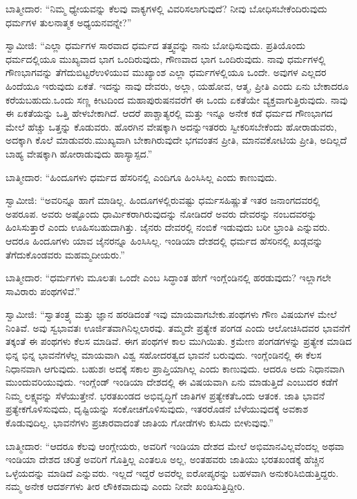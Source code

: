 ಬಾತ್ಮೀದಾರ: “ನಿಮ್ಮ ಧ್ಯೇಯವನ್ನು ಕೆಲವು ವಾಕ್ಯಗಳಲ್ಲಿ ವಿವರಿಸಲಾಗುವುದೆ? ನೀವು ಬೋಧಿಸಬೇಕೆಂದಿರುವುದು ಧರ್ಮಗಳ ತುಲನಾತ್ಮಕ ಅಧ್ಯಯನವನ್ನೇ?”

ಸ್ವಾಮೀಜಿ: “ಎಲ್ಲಾ ಧರ್ಮಗಳ ಸಾರವಾದ ಧರ್ಮದ ತತ್ತ್ವವನ್ನು ನಾನು ಬೋಧಿಸುವುದು. ಪ್ರತಿಯೊಂದು ಧರ್ಮದಲ್ಲಿಯೂ ಮುಖ್ಯವಾದ ಭಾಗ ಒಂದಿರುವುದು, ಗೌಣವಾದ ಭಾಗ ಒಂದಿರುವುದು. ನಾವು ಧರ್ಮಗಳಲ್ಲಿ ಗೌಣಭಾಗವನ್ನು ತೆಗೆದುಬಿಟ್ಟರೆ\break ಉಳಿಯುವ ಮುಖ್ಯಾಂಶ ಎಲ್ಲಾ ಧರ್ಮಗಳಲ್ಲಿಯೂ ಒಂದೇ. ಅವುಗಳ ಎಲ್ಲದರ ಹಿಂದೆಯೂ ಇರುವುದು ಏಕತೆ. ಇದನ್ನು ನಾವು ದೇವರು, ಅಲ್ಲಾ, ಯಹೋವ, ಆತ್ಮ, ಪ್ರೀತಿ ಎಂದು ಏನು ಬೇಕಾದರೂ ಕರೆಯಬಹುದು.ಒಂದು ಸಣ್ಣ ಕೀಟದಿಂದ ಮಹಾ\-ಪುರುಷನವರೆಗೆ ಈ ಒಂದು ಏಕತೆಯೇ ವ್ಯಕ್ತವಾಗುತ್ತಿರುವುದು. ನಾವು ಈ ಏಕತೆಯನ್ನು ಒತ್ತಿ ಹೇಳಬೇಕಾಗಿದೆ. ಆದರೆ ಪಾಶ್ಚಾತ್ಯರಲ್ಲಿ ಮತ್ತು ಇನ್ನೂ ಅನೇಕ ಕಡೆ ಧರ್ಮದ ಗೌಣಭಾಗದ ಮೇಲೆ ಹೆಚ್ಚು ಒತ್ತನ್ನು ಕೊಡುವರು. ಹೊರಗಿನ ವೇಷಕ್ಕಾಗಿ ಅದನ್ನು\break ಇತರರು ಸ್ವೀಕರಿಸಬೇಕೆಂದು ಹೋರಾಡುವರು, ಅದಕ್ಕಾಗಿ ಕೊಲೆ ಮಾಡುವರು.\break ಮುಖ್ಯವಾಗಿ ಬೇಕಾಗಿರುವುದೇ ಭಗವಂತನ ಪ್ರೀತಿ, ಮಾನವಕೋಟಿಯ ಪ್ರೀತಿ, ಅದಿಲ್ಲದೆ ಬಾಹ್ಯ ವೇಷಕ್ಕಾಗಿ ಹೋರಾಡುವುದು ಹಾಸ್ಯಾಸ್ಪದ.”

ಬಾತ್ಮೀದಾರ: “ಹಿಂದೂಗಳು ಧರ್ಮದ ಹೆಸರಿನಲ್ಲಿ ಎಂದಿಗೂ ಹಿಂಸಿಸಿಲ್ಲ ಎಂದು ಕಾಣುವುದು.

\eject

ಸ್ವಾಮೀಜಿ: “ಅವರಿನ್ನೂ ಹಾಗೆ ಮಾಡಿಲ್ಲ. ಹಿಂದೂಗಳಲ್ಲಿರುವಷ್ಟು ಧರ್ಮಸಹಿಷ್ಣುತೆ ಇತರ ಜನಾಂಗದವರಲ್ಲಿ ಅಪರೂಪ. ಅವರು ಅಷ್ಟೊಂದು ಧಾರ್ಮಿಕರಾಗಿರುವುದನ್ನು ನೋಡಿದರೆ ಅವರು ದೇವರನ್ನು ನಂಬದವರನ್ನು ಹಿಂಸಿಸುತ್ತಾರೆ ಎಂದು ಊಹಿಸಬಹುದಾಗಿತ್ತು. ಜೈನರು ದೇವರಲ್ಲಿ ನಂಬಿಕೆ ಇಡುವುದು ಬರೀ ಭ್ರಾಂತಿ ಎನ್ನುವರು. ಆದರೂ ಹಿಂದೂಗಳು ಯಾವ ಜೈನರನ್ನೂ ಹಿಂಸಿಸಿಲ್ಲ. ಇಂಡಿಯಾ ದೇಶದಲ್ಲಿ ಧರ್ಮದ ಹೆಸರಿನಲ್ಲಿ ಖಡ್ಗವನ್ನು ತೆಗೆದುಕೊಂಡವರು ಮಹಮ್ಮದೀಯರು.”

ಬಾತ್ಮೀದಾರ: “ಧರ್ಮಗಳು ಮೂಲತಃ ಒಂದೇ ಎಂಬ ಸಿದ್ಧಾಂತ ಹೇಗೆ ಇಂಗ್ಲೆಂಡಿನಲ್ಲಿ ಹರಡುವುದು? ಇಲ್ಲಾಗಲೇ ಸಾವಿರಾರು ಪಂಥಗಳಿವೆ.”

ಸ್ವಾಮೀಜಿ: “ಸ್ವಾತಂತ್ರ್ಯ ಮತ್ತು ಜ್ಞಾನ ಹರಡಿದಂತೆ ಇವು ಮಾಯವಾಗಬೇಕು.\break ಪಂಥಗಳು ಗೌಣ ವಿಷಯಗಳ ಮೇಲೆ ನಿಂತಿವೆ. ಅವು ಸ್ವಭಾವತಃ ಊರ್ಜಿತವಾಗಿ\break ನಿಲ್ಲಲಾರವು. ತಮ್ಮದೇ ಪ್ರತ್ಯೇಕ ಪಂಗಡ ಎಂದು ಆಲೋಚಿಸಿದವರ ಭಾವನೆಗೆ ತಕ್ಕಂತೆ ಈ ಪಂಥಗಳು ಕೆಲಸ ಮಾಡಿವೆ. ಈಗ ಪಂಥಗಳ ಕಾಲ ಮುಗಿಯಿತು. ಕ್ರಮೇಣ ಪಂಗಡಗಳನ್ನು ಪ್ರತ್ಯೇಕ ಮಾಡಿದ ಭಿನ್ನ ಭಿನ್ನ ಭಾವನೆಗಳೆಲ್ಲ ಮಾಯವಾಗಿ ವಿಶ್ವ ಸಹೋದರತ್ವದ ಭಾವನೆ ಬರುವುದು. ಇಂಗ್ಲೆಂಡಿನಲ್ಲಿ ಈ ಕೆಲಸ ನಿಧಾನವಾಗಿ ಆಗುವುದು. ಬಹುಶಃ ಅದಕ್ಕೆ ಸಕಾಲ ಪ್ರಾಪ್ತಿಯಾಗಿಲ್ಲ ಎಂದು ಕಾಣುವುದು. ಆದರೂ ಅದು ನಿಧಾನವಾಗಿ ಮುಂದುವರಿಯುವುದು. ಇಂಗ್ಲೆಂಡ್​ ಇಂಡಿಯಾ ದೇಶದಲ್ಲಿ ಈ ವಿಷಯವಾಗಿ ಏನು ಮಾಡುತ್ತಿದೆ ಎಂಬುದರ ಕಡೆಗೆ ನಿಮ್ಮ ಲಕ್ಷ್ಯವನ್ನು ಸೆಳೆಯುತ್ತೇನೆ. ಭರತಖಂಡದ ಅಭಿವೃದ್ಧಿಗೆ ಜಾತಿಗಳ ಪ್ರತ್ಯೇಕತೆ\break ಒಂದು ಆತಂಕ. ಜಾತಿ ಭಾವನೆ ಪ್ರತ್ಯೇಕಗೊಳಿಸುವುದು, ದೃಷ್ಟಿಯನ್ನು ಸಂಕೋಚಗೊಳಿಸುವುದು, ಇತರರೊಡನೆ ಬೆಳೆಯುವುದಕ್ಕೆ ಅವಕಾಶ ಕೊಡುವುದಿಲ್ಲ. ಭಾವನೆಗಳು ಪ್ರಚಾರ\-ವಾದಂತೆ ಜಾತಿಯ ಗೋಡೆಗಳು ಕುಸಿದು ಬೀಳುವುವು.”

ಬಾತ್ಮೀದಾರ: “ಆದರೂ ಕೆಲವು ಆಂಗ್ಲೇಯರು, ಅವರಿಗೆ ಇಂಡಿಯಾ ದೇಶದ ಮೇಲೆ ಅಭಿಮಾನವಿಲ್ಲವೆಂದಲ್ಲ ಅಥವಾ ಇಂಡಿಯಾ ದೇಶದ ಚರಿತ್ರೆ ಅವರಿಗೆ ಗೊತ್ತಿಲ್ಲ ಎಂತಲೂ ಅಲ್ಲ, ಅಂತಹವರು ಜಾತಿಯು ಭರತಖಂಡಕ್ಕೆ ಹೆಚ್ಚಿನ ಒಳ್ಳೆಯದನ್ನು ಮಾಡಿದೆ ಎನ್ನುವರು. ಇಲ್ಲದೆ ಇದ್ದರೆ ಅವರೆಲ್ಲ ಐರೋಪ್ಯರನ್ನು ಬಹಳವಾಗಿ ಅನುಕರಿಸಿಬಿಡುತ್ತಿದ್ದರು. ನಮ್ಮ ಅನೇಕ ಆದರ್ಶಗಳು ತೀರ ಲೌಕಿಕವಾದುವು ಎಂದು ನೀವೇ ಖಂಡಿಸುತ್ತಿದ್ದೀರಿ.

